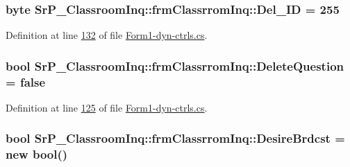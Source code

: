 \hypertarget{class_sr_p___classroom_inq_1_1frm_classrrom_inq_a9874b3534409b79a483f08f2aa03668d}{
\subsubsection[{\-Del\-\_\-\-I\-D}]{\setlength{\rightskip}{0pt plus 5cm}byte {\bf \-Sr\-P\-\_\-\-Classroom\-Inq\-::frm\-Classrrom\-Inq\-::\-Del\-\_\-\-I\-D} = 255}}
\label{class_sr_p___classroom_inq_1_1frm_classrrom_inq_a9874b3534409b79a483f08f2aa03668d}


\-Definition at line \hyperlink{_form1-dyn-ctrls_8cs_source_l00132}{132} of file \hyperlink{_form1-dyn-ctrls_8cs_source}{\-Form1-\/dyn-\/ctrls.\-cs}.

\hypertarget{class_sr_p___classroom_inq_1_1frm_classrrom_inq_ab3a8803fac827da5757e7451c1836010}{
\subsubsection[{\-Delete\-Question}]{\setlength{\rightskip}{0pt plus 5cm}bool {\bf \-Sr\-P\-\_\-\-Classroom\-Inq\-::frm\-Classrrom\-Inq\-::\-Delete\-Question} = false}}
\label{class_sr_p___classroom_inq_1_1frm_classrrom_inq_ab3a8803fac827da5757e7451c1836010}


\-Definition at line \hyperlink{_form1-dyn-ctrls_8cs_source_l00125}{125} of file \hyperlink{_form1-dyn-ctrls_8cs_source}{\-Form1-\/dyn-\/ctrls.\-cs}.

\hypertarget{class_sr_p___classroom_inq_1_1frm_classrrom_inq_ab67298a2e18c70080e8cc5e604223679}{
\subsubsection[{\-Desire\-Brdcst}]{\setlength{\rightskip}{0pt plus 5cm}bool {\bf \-Sr\-P\-\_\-\-Classroom\-Inq\-::frm\-Classrrom\-Inq\-::\-Desire\-Brdcst} = new bool()}}
\label{class_sr_p___classroom_inq_1_1frm_classrrom_inq_ab67298a2e18c70080e8cc5e604223679}


